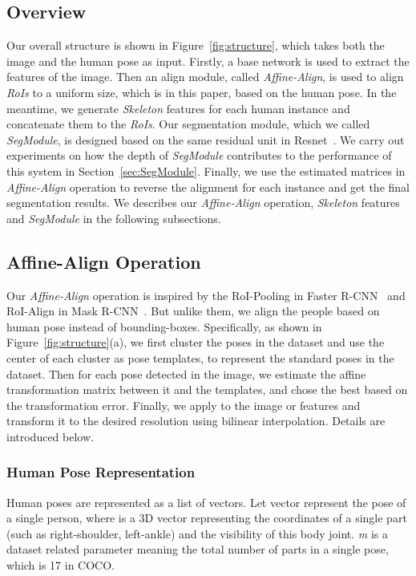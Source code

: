 \documentclass[10pt,twocolumn,letterpaper]{article}
\begin{document}
\subsection{Overview}
\label{sec:overview}
Our overall structure is shown in Figure~\ref{fig:structure}, which takes both the image and the human pose as input. Firstly, a base network is used to extract the features of the image. Then an align module, called \emph{Affine-Align}, is used to align \emph{RoIs} to a uniform size, which is  in this paper, based on the human pose. In the meantime, we generate \emph{Skeleton} features for each human instance and concatenate them to the \emph{RoIs}. Our segmentation module, which we called \emph{SegModule}, is designed based on the same residual unit in Resnet~\cite{he2016deep}. We carry out experiments on how the depth of \emph{SegModule} contributes to the performance of this system in Section~\ref{sec:SegModule}. Finally, we use the estimated matrices in \emph{Affine-Align} operation to reverse the alignment for each instance and get the final segmentation results. We describes our \emph{Affine-Align} operation, \emph{Skeleton} features and \emph{SegModule} in the following subsections.

\subsection{Affine-Align Operation}
\label{sec:AffineAlign}
Our \emph{Affine-Align} operation is inspired by the RoI-Pooling in Faster R-CNN~\cite{ren2015faster} and RoI-Align in Mask R-CNN~\cite{He2017Mask}. But unlike them, we align the people based on human pose instead of bounding-boxes. Specifically, as shown in Figure~\ref{fig:structure}(a), we first cluster the poses in the dataset and use the center of each cluster as pose templates, to represent the standard poses in the dataset. Then for each pose detected in the image, we estimate the affine transformation matrix  between it and the templates, and chose the best  based on the transformation error. Finally, we apply  to the image or features and transform it to the desired resolution using bilinear interpolation. Details are introduced below.

\subsubsection{Human Pose Representation}
Human poses are represented as a list of vectors. Let vector   represent the pose of a single person, where  is a 3D vector 
representing the coordinates of a single part (such as right-shoulder, left-ankle) and the visibility of this body joint. \emph{m} is a dataset related parameter meaning the total number of parts in a single pose, which is 17 in COCO. 
\end{document}

